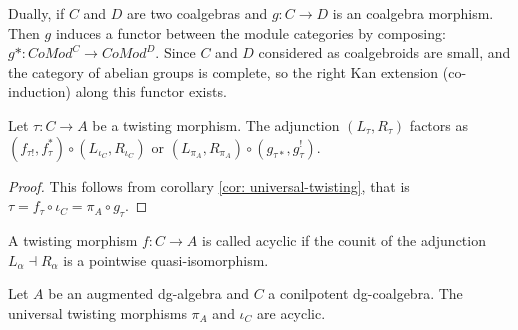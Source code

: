 \documentclass[../thesis.tex]{subfiles}
\begin{document}
            Dually, if $C$ and $D$ are two coalgebras and $g : C \rightarrow D$ is an coalgebra morphism. Then $g$ induces a functor between the module categories by composing: $g* : CoMod^C \rightarrow CoMod^D$. Since $C$ and $D$ considered as coalgebroids are small, and the category of abelian groups is complete, so the right Kan extension (co-induction) along this functor exists.
            \begin{center}
            \end{center}

            \begin{lemma}\label{lem: twist-fac}
                Let $\tau : C \rightarrow A$ be a twisting morphism. The adjunction $(L_\tau, R_\tau)$ factors as $(f_{\tau !}, f_\tau^*)\circ (L_{\iota_C},R_{\iota_C})$ or $(L_{\pi_A},R_{\pi_A})\circ (g_{\tau *}, g_\tau^!)$.
            \end{lemma}

            \begin{proof}
                This follows from corollary \ref{cor: universal-twisting}, that is $\tau = f_\tau \circ \iota_C = \pi_A\circ g_\tau$.
            \end{proof}

            \begin{definition}
                A twisting morphism $f: C \rightarrow A$ is called acyclic if the counit of the adjunction $L_\alpha \dashv R_\alpha$ is a pointwise quasi-isomorphism.
            \end{definition}

            \begin{lemma}\label{lem: uni-twist-ac}
                Let $A$ be an augmented dg-algebra and $C$ a conilpotent dg-coalgebra. The universal twisting morphisms $\pi_A$ and $\iota_C$ are acyclic.
            \end{lemma}
\end{document}
